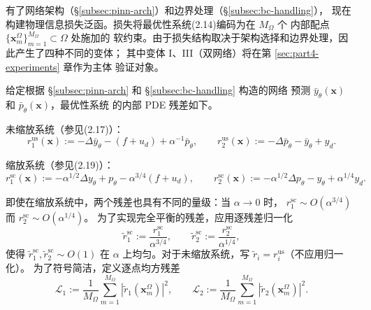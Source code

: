 \documentclass{xmu}
\theoremstyle{plain}
\theoremstyle{remark}
\begin{document}
\label{subsec:loss-construction}

有了网络架构（§\ref{subsec:pinn-arch}）和边界处理（§\ref{subsec:bc-handling}），
现在构建物理信息损失泛函。损失将最优性系统(2.14)编码为在 $M_\Omega$ 个
内部配点 $\{\mathbf{x}_m^\Omega\}_{m=1}^{M_\Omega}\subset\Omega$ 处施加的
软约束。由于损失结构取决于架构选择和边界处理，因此产生了四种不同的变体；
其中变体 I、III（双网络）将在第 \ref{sec:part4-experiments} 章作为主体
验证对象。

\label{subsubsec:pde-residual}

给定根据 §\ref{subsec:pinn-arch} 和 §\ref{subsec:bc-handling} 构造的网络
预测 $\bar y_\theta(\mathbf{x})$ 和 $\bar p_\theta(\mathbf{x})$，最优性系统
的内部 PDE 残差如下。

未缩放系统（参见(2.17)）：
\begin{equation}
r_1^{\mathrm{us}}(\mathbf{x})
:= -\Delta\bar y_\theta-(f+u_d)+\alpha^{-1}\bar p_\theta,
\qquad
r_2^{\mathrm{us}}(\mathbf{x})
:= -\Delta\bar p_\theta-\bar y_\theta+y_d.
\label{eq:res-us}
\end{equation}

缩放系统（参见(2.19)）：
\begin{equation}
r_1^{\mathrm{sc}}(\mathbf{x})
:= -\alpha^{1/2}\Delta y_\theta+p_\theta-\alpha^{3/4}(f+u_d),
\qquad
r_2^{\mathrm{sc}}(\mathbf{x})
:= -\alpha^{1/2}\Delta p_\theta-y_\theta+\alpha^{1/4}y_d.
\label{eq:res-sc}
\end{equation}

即使在缩放系统中，两个残差也具有不同的量级：当 $\alpha\to 0$ 时，
$r_1^{\mathrm{sc}}\sim O(\alpha^{3/4})$ 而 $r_2^{\mathrm{sc}}\sim O(\alpha^{1/4})$。
为了实现完全平衡的残差，应用逐残差归一化
\begin{equation}
\tilde r_1^{\mathrm{sc}} := \frac{r_1^{\mathrm{sc}}}{\alpha^{3/4}},
\qquad
\tilde r_2^{\mathrm{sc}} := \frac{r_2^{\mathrm{sc}}}{\alpha^{1/4}},
\label{eq:res-normalize}
\end{equation}
使得 $\tilde r_1^{\mathrm{sc}},\tilde r_2^{\mathrm{sc}}\sim O(1)$ 在 $\alpha$
上均匀。对于未缩放系统，写 $\tilde r_i=r_i^{\mathrm{us}}$（不应用归一化）。
为了符号简洁，定义逐点均方残差
\begin{equation}
\mathcal{L}_1 := \frac{1}{M_\Omega}\sum_{m=1}^{M_\Omega}|\tilde r_1(\mathbf{x}_m^\Omega)|^2,
\qquad
\mathcal{L}_2 := \frac{1}{M_\Omega}\sum_{m=1}^{M_\Omega}|\tilde r_2(\mathbf{x}_m^\Omega)|^2.
\end{equation}
\end{document}
